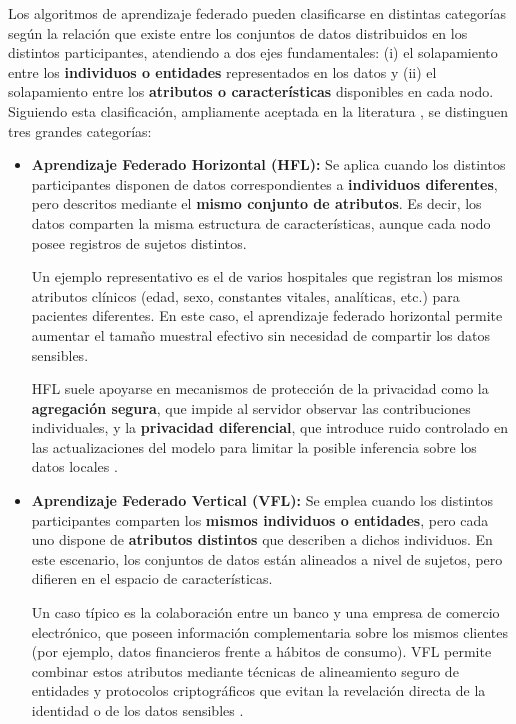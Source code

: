 \documentclass{report}
\begin{document}
Los algoritmos de aprendizaje federado pueden clasificarse en distintas categorías según la relación que existe entre los conjuntos de datos distribuidos en los distintos participantes, atendiendo a dos ejes fundamentales:  
(i) el solapamiento entre los \textbf{individuos o entidades} representados en los datos y  
(ii) el solapamiento entre los \textbf{atributos o características} disponibles en cada nodo.  
Siguiendo esta clasificación, ampliamente aceptada en la literatura \cite{kairouz2021advances,zhang2021survey}, se distinguen tres grandes categorías:

\begin{itemize}
    \item \textbf{Aprendizaje Federado Horizontal (HFL):}  
    Se aplica cuando los distintos participantes disponen de datos correspondientes a \textbf{individuos diferentes}, pero descritos mediante el \textbf{mismo conjunto de atributos}. Es decir, los datos comparten la misma estructura de características, aunque cada nodo posee registros de sujetos distintos.  

    Un ejemplo representativo es el de varios hospitales que registran los mismos atributos clínicos (edad, sexo, constantes vitales, analíticas, etc.) para pacientes diferentes. En este caso, el aprendizaje federado horizontal permite aumentar el tamaño muestral efectivo sin necesidad de compartir los datos sensibles.  

    HFL suele apoyarse en mecanismos de protección de la privacidad como la \textbf{agregación segura}, que impide al servidor observar las contribuciones individuales, y la \textbf{privacidad diferencial}, que introduce ruido controlado en las actualizaciones del modelo para limitar la posible inferencia sobre los datos locales \cite{bonawitz2017practical,bonawitz2019towards}.

    \item \textbf{Aprendizaje Federado Vertical (VFL):}  
    Se emplea cuando los distintos participantes comparten los \textbf{mismos individuos o entidades}, pero cada uno dispone de \textbf{atributos distintos} que describen a dichos individuos. En este escenario, los conjuntos de datos están alineados a nivel de sujetos, pero difieren en el espacio de características.  

    Un caso típico es la colaboración entre un banco y una empresa de comercio electrónico, que poseen información complementaria sobre los mismos clientes (por ejemplo, datos financieros frente a hábitos de consumo).  
    VFL permite combinar estos atributos mediante técnicas de alineamiento seguro de entidades y protocolos criptográficos que evitan la revelación directa de la identidad o de los datos sensibles \cite{cheng2021secureboost,liu2020asymmetrical}.


\end{itemize}
\end{document}
